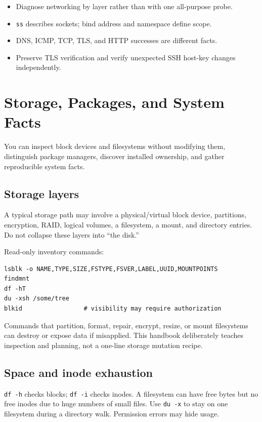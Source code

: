 \documentclass[11pt,oneside,openany]{book}
\newcommand{\chaptergoals}[1]{%
  \begin{tcolorbox}[colback=Paper,colframe=Blue,title={Learning outcomes},fonttitle=\bfseries]
  #1
  \end{tcolorbox}}
\begin{document}
\begin{recapbox}
\begin{itemize}
  \item Diagnose networking by layer rather than with one all-purpose probe.
  \item \texttt{ss} describes sockets; bind address and namespace define scope.
  \item DNS, ICMP, TCP, TLS, and HTTP successes are different facts.
  \item Preserve TLS verification and verify unexpected SSH host-key changes independently.
\end{itemize}
\end{recapbox}

\chapter{Storage, Packages, and System Facts}
\chaptergoals{You can inspect block devices and filesystems without modifying them, distinguish package managers, discover installed ownership, and gather reproducible system facts.}

\section{Storage layers}
A typical storage path may involve a physical/virtual block device, partitions, encryption, RAID, logical volumes, a filesystem, a mount, and directory entries. Do not collapse these layers into “the disk.”

Read-only inventory commands:
\begin{lstlisting}
lsblk -o NAME,TYPE,SIZE,FSTYPE,FSVER,LABEL,UUID,MOUNTPOINTS
findmnt
df -hT
du -xsh /some/tree
blkid                 # visibility may require authorization
\end{lstlisting}
Commands that partition, format, repair, encrypt, resize, or mount filesystems can destroy or expose data if misapplied. This handbook deliberately teaches inspection and planning, not a one-line storage mutation recipe.

\section{Space and inode exhaustion}
\texttt{df -h} checks blocks; \texttt{df -i} checks inodes. A filesystem can have free bytes but no free inodes due to huge numbers of small files. Use \texttt{du -x} to stay on one filesystem during a directory walk. Permission errors may hide usage.
\end{document}
